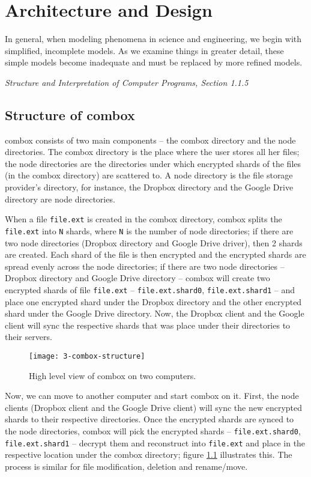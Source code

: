 \chapter{Architecture and Design}

\epigraph{In general, when modeling phenomena in science and
  engineering, we begin with simplified, incomplete models. As we
  examine things in greater detail, these simple models become
  inadequate and must be replaced by more refined
  models.}{\textit{Structure and Interpretation of Computer Programs,
    Section 1.1.5}\cite{sicp}}

\section{Structure of combox}

combox consists of two main components -- the combox directory and the
node directories. The combox directory is the place where the user
stores all her files; the node directories are the directories under
which encrypted shards of the files (in the combox directory) are
scattered to. A node directory is the file storage provider's
directory, for instance, the Dropbox directory and the Google Drive
directory are node directories.

When a file \verb+file.ext+ is created in the combox directory, combox
splits the \verb+file.ext+ into \verb+N+ shards, where \verb+N+ is the
number of node directories; if there are two node directories (Dropbox
directory and Google Drive driver), then 2 shards are created. Each
shard of the file is then encrypted and the encrypted shards are
spread evenly across the node directories; if there are two node
directories -- Dropbox directory and Google Drive directory -- combox
will create two encrypted shards of file \verb+file.ext+ --
\verb+file.ext.shard0+, \verb+file.ext.shard1+ -- and place one
encrypted shard under the Dropbox directory and the other encrypted
shard under the Google Drive directory. Now, the Dropbox client and
the Google client will sync the respective shards that was place under
their directories to their servers.

\begin{figure}[h]
\texttt{[image: 3-combox-structure]}
\caption{High level view of combox on two computers.}
\label{fig:3-combox-structure}
\end{figure}

Now, we can move to another computer and start combox on it. First,
the node clients (Dropbox client and the Google Drive client) will
sync the new encrypted shards to their respective directories. Once
the encrypted shards are synced to the node directories, combox will
pick the encrypted shards -- \verb+file.ext.shard0+,
\verb+file.ext.shard1+ -- decrypt them and reconstruct into
\verb+file.ext+ and place in the respective location under the combox
directory; figure \ref{fig:3-combox-structure} illustrates this. The
process is similar for file modification, deletion and rename/move.

